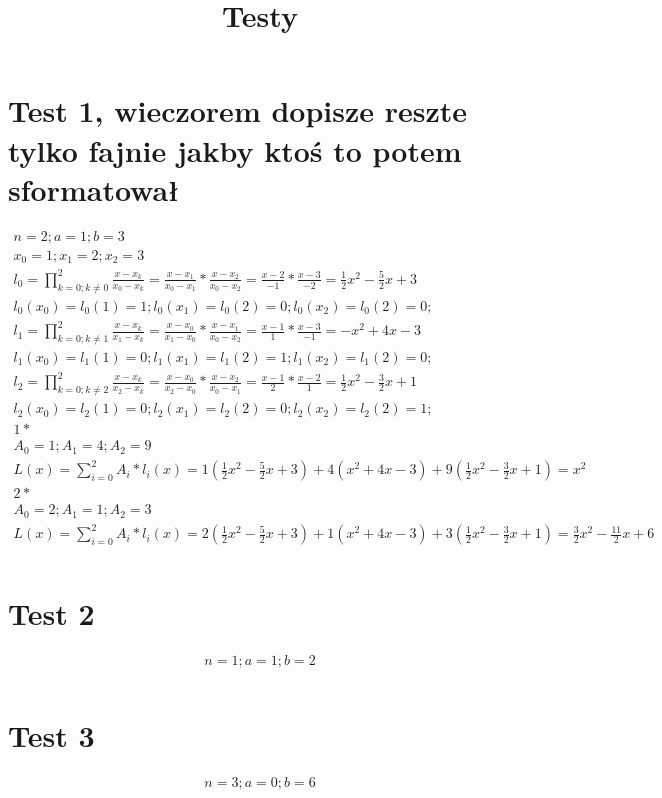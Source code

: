 \documentclass[12pt,a4paper]{article}
\title{Testy}
\theoremstyle{definition}
\begin{document}


\section{Test 1, wieczorem dopisze reszte tylko fajnie jakby ktoś to potem sformatował}

	\begin{displaymath} 
\begin{split}
		n=2; a=1; b=3  \\
		x_0=1; x_1=2; x_2=3\\
l_0=\prod\limits_{k=0;k\neq0}^2\frac{x-x_k}{x_0-x_k}=\frac{x-x_1}{x_0-x_1}*\frac{x-x_2}{x_0-x_2}=\frac{x-2}{-1}*\frac{x-3}{-2}=\frac{1}{2}x^2-\frac{5}{2}x+3\\
l_0(x_0)=l_0(1)=1; l_0(x_1)=l_0(2)=0; l_0(x_2)=l_0(2)=0;\\
l_1=\prod\limits_{k=0;k\neq1}^2\frac{x-x_k}{x_1-x_k}=\frac{x-x_0}{x_1-x_0}*\frac{x-x_1}{x_0-x_2}=\frac{x-1}{1}*\frac{x-3}{-1}=-x^2+4x-3\\
l_1(x_0)=l_1(1)=0; l_1(x_1)=l_1(2)=1; l_1(x_2)=l_1(2)=0;\\
l_2=\prod\limits_{k=0;k\neq2}^2\frac{x-x_k}{x_2-x_k}=\frac{x-x_0}{x_2-x_0}*\frac{x-x_2}{x_0-x_1}=\frac{x-1}{2}*\frac{x-2}{1}=\frac{1}{2}x^2-\frac{3}{2}x+1\\
l_2(x_0)=l_2(1)=0; l_2(x_1)=l_2(2)=0; l_2(x_2)=l_2(2)=1;\\
1*\\
A_0=1; A_1=4; A_2=9\\
L(x)=\sum\limits_{i=0}^2A_i*l_i(x)=1(\frac{1}{2}x^2-\frac{5}{2}x+3)+4(x^2+4x-3)+9(\frac{1}{2}x^2-\frac{3}{2}x+1)=x^2\\
2*\\
A_0=2; A_1=1; A_2=3\\
L(x)=\sum\limits_{i=0}^2A_i*l_i(x)=2(\frac{1}{2}x^2-\frac{5}{2}x+3)+1(x^2+4x-3)+3(\frac{1}{2}x^2-\frac{3}{2}x+1)=\frac{3}{2}x^2-\frac{11}{2}x+6\\
\end{split}
\end{displaymath}

\section{Test 2}
\begin{displaymath} 
\begin{split}
n=1; a=1; b=2\\
\end{split}
\end{displaymath}
\section{Test 3}
\begin{displaymath} 
\begin{split}
n=3; a=0; b=6
\end{split}
\end{displaymath}
\end{document}

